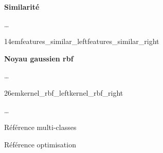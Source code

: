 \textbf{Similarité}

…

{14em}{features_similar_left}{features_similar_right}

\pagebreak

\textbf{Noyau gaussien \gls{rbf}}

…

{26em}{kernel_rbf_left}{kernel_rbf_right}

…

Référence multi-classes \cite{multi-class}

Référence optimisation \cite{mri} \cite{optimization}

\pagebreak

